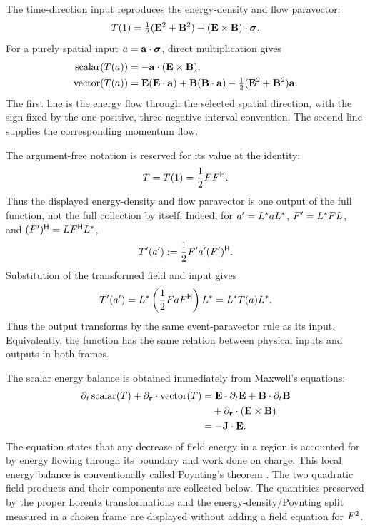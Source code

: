 The time-direction input reproduces the energy-density and flow paravector:
\[
T(1)=\tfrac12(\mathbf{E}^2+\mathbf{B}^2)
+(\mathbf{E}\times\mathbf{B})\cdot\mathbf{\bm{\sigma}}.
\]
For a purely spatial input
\(a=\mathbf{a}\cdot\mathbf{\bm{\sigma}}\), direct multiplication gives
\begin{align*}
\operatorname{scalar}(T(a))
&=-\mathbf{a}\cdot(\mathbf{E}\times\mathbf{B}),\\
\operatorname{vector}(T(a))
&=\mathbf{E}(\mathbf{E}\cdot\mathbf{a})
+\mathbf{B}(\mathbf{B}\cdot\mathbf{a})
-\tfrac12(\mathbf{E}^2+\mathbf{B}^2)\mathbf{a}.
\end{align*}
The first line is the energy flow through the selected spatial direction,
with the sign fixed by the one-positive, three-negative interval
convention. The second line supplies the corresponding momentum flow.

The argument-free notation is reserved for its value at the identity:
\[
T=T(1)=\frac12FF^{\mathsf H}.
\]
Thus the displayed energy-density and flow paravector is one output of the
full function, not the full collection by itself.
Indeed, for \(a'=L^*aL^*\),
\(F'=L^*FL\), and
\((F')^{\mathsf H}=LF^{\mathsf H}L^*\),
\begin{equation}
T'(a')
:=\frac12F'a'(F')^{\mathsf H}.
\label{eq:transformed-stress-energy-map}
\end{equation}
Substitution of the transformed field and input gives
\begin{equation}
T'(a')
=L^*\left(\frac12FaF^{\mathsf H}\right)L^*
=L^*T(a)L^*.
\label{eq:stress-energy-map-covariance}
\end{equation}
Thus the output transforms by the same event-paravector rule as its input.
Equivalently, the function has the same relation between physical inputs and
outputs in both frames.

The scalar energy balance is obtained immediately from Maxwell's equations:
\begin{align*}
\partial_t\operatorname{scalar}(T)
+\partial_{\mathbf{r}}\cdot\operatorname{vector}(T)
&=\mathbf{E}\cdot\partial_t\mathbf{E}
 +\mathbf{B}\cdot\partial_t\mathbf{B}\notag\\
&\quad+\partial_{\mathbf{r}}\cdot(\mathbf{E}\times\mathbf{B})\notag\\
&=-\mathbf{J}\cdot\mathbf{E}.
\end{align*}
The equation states that any decrease of field energy in a region is
accounted for by energy flowing through its boundary and work done on
charge. This local energy balance is conventionally called Poynting's
theorem \cite{jackson1998}. The two quadratic field products and their
components are collected below. The quantities preserved by the proper
Lorentz transformations and the energy-density/Poynting split measured in a
chosen frame are displayed without adding a field equation for
\(F^2\).

